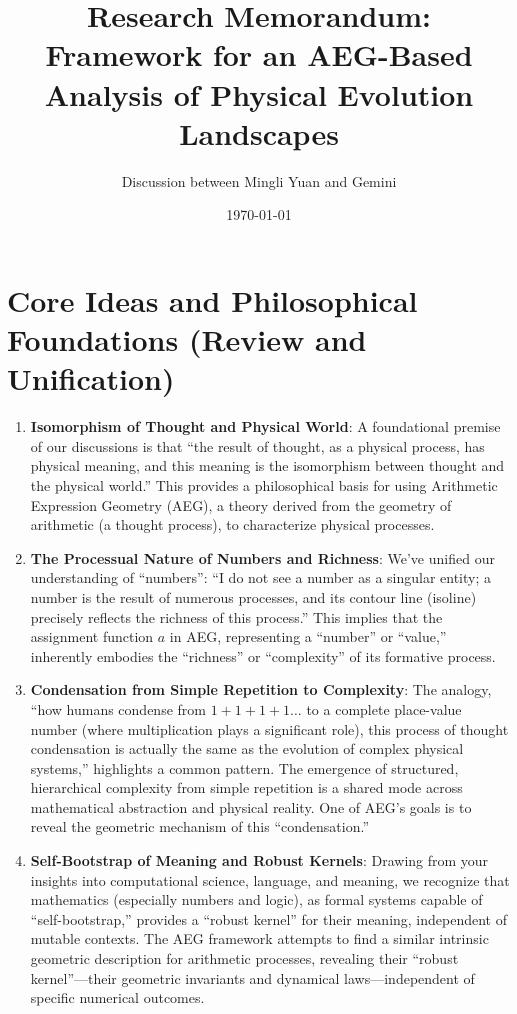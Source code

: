 \documentclass[12pt]{article}
\title{Research Memorandum: Framework for an AEG-Based Analysis of Physical Evolution Landscapes}
\author{Discussion between Mingli Yuan and Gemini}
\date{\today}
\begin{document}
\maketitle
\tableofcontents
\newpage

\section{Core Ideas and Philosophical Foundations (Review and Unification)}

\begin{enumerate}
    \item \textbf{Isomorphism of Thought and Physical World}: A foundational premise of our discussions is that ``the result of thought, as a physical process, has physical meaning, and this meaning is the isomorphism between thought and the physical world.'' This provides a philosophical basis for using Arithmetic Expression Geometry (AEG), a theory derived from the geometry of arithmetic (a thought process), to characterize physical processes.

    \item \textbf{The Processual Nature of Numbers and Richness}: We've unified our understanding of ``numbers'': ``I do not see a number as a singular entity; a number is the result of numerous processes, and its contour line (isoline) precisely reflects the richness of this process.'' This implies that the assignment function $a$ in AEG, representing a ``number'' or ``value,'' inherently embodies the ``richness'' or ``complexity'' of its formative process.

    \item \textbf{Condensation from Simple Repetition to Complexity}: The analogy, ``how humans condense from $1+1+1+1\dots$ to a complete place-value number (where multiplication plays a significant role), this process of thought condensation is actually the same as the evolution of complex physical systems,'' highlights a common pattern. The emergence of structured, hierarchical complexity from simple repetition is a shared mode across mathematical abstraction and physical reality. One of AEG's goals is to reveal the geometric mechanism of this ``condensation.''

    \item \textbf{Self-Bootstrap of Meaning and Robust Kernels}: Drawing from your insights into computational science, language, and meaning, we recognize that mathematics (especially numbers and logic), as formal systems capable of ``self-bootstrap,'' provides a ``robust kernel'' for their meaning, independent of mutable contexts. The AEG framework attempts to find a similar intrinsic geometric description for arithmetic processes, revealing their ``robust kernel''---their geometric invariants and dynamical laws---independent of specific numerical outcomes.
\end{enumerate}
\end{document}
